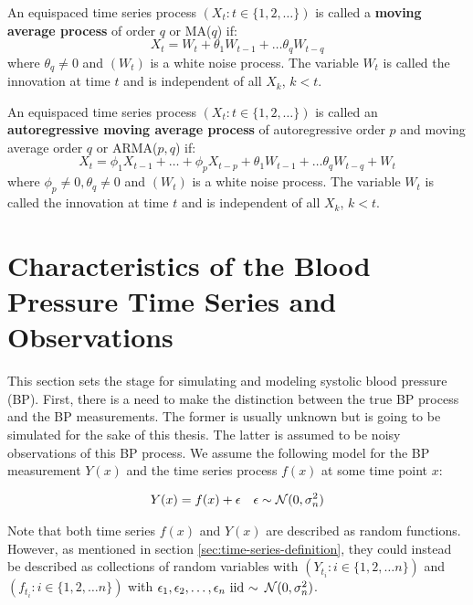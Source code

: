 \begin{example}
    An equispaced time series process $(X_t: t \in \{1,2, \dots\})$ is called a
    \textbf{moving average process} of order $q$ or MA($q$) if:
    \[
        X_t = W_t + \theta_1 W_{t-1} + \dots \theta_q W_{t-q}
    \]
    where $\theta_q \neq 0$ and $(W_t)$ is a white noise process. The variable $W_t$
    is called the innovation at time $t$ and is independent of all $X_k$, $k < t$.
\end{example}

\begin{example}
    An equispaced time series process $(X_t: t \in \{1,2, \dots\})$ is called an
    \textbf{autoregressive moving average process} of autoregressive order $p$ and
    moving average order $q$ or ARMA($p,q$) if:
    \[
        X_t =  \phi_1 X_{t-1} + \dots + \phi_p X_{t-p} + \theta_1 W_{t-1} + \dots
        \theta_q W_{t-q} + W_t
    \]
    where $\phi_p \neq 0, \theta_q \neq 0$ and $(W_t)$ is a white noise process.
    The variable $W_t$ is called the innovation at time $t$ and is independent of all
    $X_k$, $k < t$.
\end{example}

\section{Characteristics of the Blood Pressure Time Series and Observations}\label{sec:characteristics-of-the-blood-pressure-time-series}

This section sets the stage for simulating
and modeling systolic blood pressure (BP). First, there is a need to make the
distinction between the true BP process and the BP measurements. The former is
usually unknown but is going to be simulated for the sake of this thesis. The
latter is assumed to be noisy observations of this BP process. We assume the
following model for the BP measurement $Y(x)$ and the time series process $f(x)$ at
some time point $x$:

\begin{align*}
    Y(x) = f(x) + \epsilon && \epsilon \sim \operatorname{\mathcal{N}}(0, \sigma_n^{2})
\end{align*}

Note that both time series $f(x)$ and $Y(x)$ are described as random functions.
However, as mentioned in section \ref{sec:time-series-definition}, they could
instead be described as collections of random variables with $(Y_{t_i}: i \in
\{1, 2, \dots n\})$ and $(f_{t_i}: i \in \{1, 2, \dots n\})$ with $\epsilon_1,
\epsilon_2, \dots, \epsilon_n \text{ iid }{\sim} \text{ } \operatorname{\mathcal{N}}(0, \sigma_n^{2})$.


